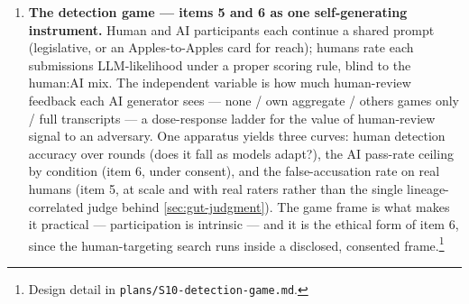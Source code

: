 \begin{enumerate}
  objective \emph{is} a model of the human reviewer --- rewrite to minimise a
  held-out human-proxy\textquotesingle s AI-likeness rating (and, in the strong form, to
  maximise its rated authenticity above the genuine-human baseline). This
  measures how far "more human than human" can be pushed when it is the
  explicit target rather than a by-product, i.e. the ceiling of the
  false-accusation problem a disclosure regime would face. Framed and run as
  \emph{measurement} of an adversary\textquotesingle s reachable frontier, not as a deployable
  deception tool: the deliverable is the reachable rating gap and what text
  features drive it (pairing with the register-feature instrument in item 2, so
  the output is named features rather than a black-box rewrite), reported so
  that reviewers and disclosure policies can be built against the ceiling
  rather than the current floor. The obvious dual-use tension is real and is
  the reason to publish the ceiling openly rather than leave it to be found
  privately.
\item
  \textbf{The detection game --- items 5 and 6 as one self-generating instrument.}
  Human and AI participants each continue a shared prompt (legislative, or an
  Apples-to-Apples card for reach); humans rate each submission\textquotesingle s
  LLM-likelihood under a proper scoring rule, blind to the human:AI mix. The
  independent variable is how much human-review feedback each AI generator
  sees --- none / own aggregate / others\textquotesingle{} games only / full transcripts --- a
  dose-response ladder for the value of human-review signal to an adversary.
  One apparatus yields three curves: human detection accuracy over rounds
  (does it fall as models adapt?), the AI pass-rate ceiling by condition
  (item 6, under consent), and the false-accusation rate on real humans
  (item 5, at scale and with real raters rather than the single
  lineage-correlated judge behind \cref{sec:gut-judgment}). The game frame is what makes it
  practical --- participation is intrinsic --- and it is the ethical form of
  item 6, since the human-targeting search runs inside a disclosed,
  consented frame.\footnote{Design detail in \texttt{plans/\allowbreak{}S10-\allowbreak{}detection-\allowbreak{}game.\allowbreak{}md}.}
\end{enumerate}


